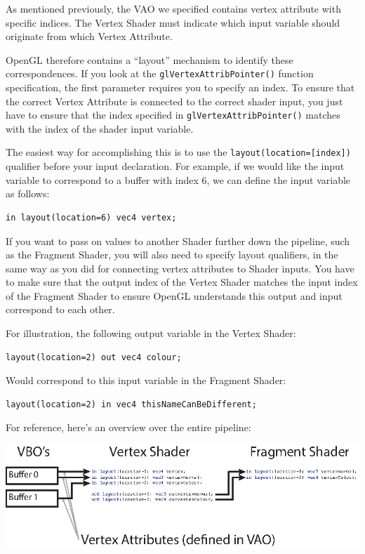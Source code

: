 As mentioned previously, the VAO we specified contains vertex attribute with specific indices. The Vertex Shader must indicate which input variable should originate from which Vertex Attribute. 

OpenGL therefore contains a ``layout'' mechanism to identify these correspondences. If you look at the \texttt{glVertexAttribPointer()} function specification, the first parameter requires you to specify an index. To ensure that the correct Vertex Attribute is connected to the correct shader input, you just have to ensure that the index specified in \texttt{glVertexAttribPointer()} matches with the index of the shader input variable.

The easiest way for accomplishing this is to use the \texttt{layout(location=[index])} qualifier before your input declaration. For example, if we would like the input variable to correspond to a buffer with index 6, we can define the input variable as follows:

\begin{verbatim}
in layout(location=6) vec4 vertex;
\end{verbatim}

If you want to pass on values to another Shader further down the pipeline, such as the Fragment Shader, you will also need to specify layout qualifiers, in the same way as you did for connecting vertex attributes to Shader inputs. You have to make sure that the output index of the Vertex Shader matches the input index of the Fragment Shader to ensure OpenGL understands this output and input correspond to each other. 

For illustration, the following output variable in the Vertex Shader:

\begin{verbatim}
layout(location=2) out vec4 colour;
\end{verbatim}

Would correspond to this input variable in the Fragment Shader:

\begin{verbatim}
layout(location=2) in vec4 thisNameCanBeDifferent;
\end{verbatim}

For reference, here's an overview over the entire pipeline:

\vspace{0.5cm}
\centerline {
  \includegraphics[scale=1.4]{images/overview.eps}
}
\vspace{0.5cm}

